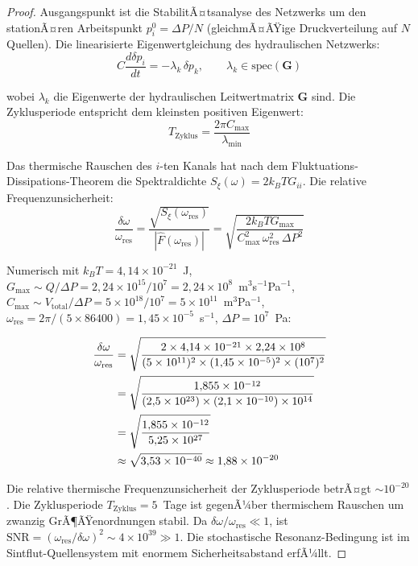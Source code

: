 ﻿\documentclass[12pt,a4paper]{report}
\begin{document}
\begin{proof}
	Ausgangspunkt ist die StabilitÃ¤tsanalyse des Netzwerks um den stationÃ¤ren Arbeitspunkt $p_i^0 = \Delta P/N$ (gleichmÃ¤ÃŸige Druckverteilung auf $N$ Quellen). Die linearisierte Eigenwertgleichung des hydraulischen Netzwerks:
	\begin{equation}
		C\frac{d\delta p_i}{dt} = -\lambda_k\,\delta p_k, \qquad \lambda_k \in \mathrm{spec}(\mathbf{G})
		\label{eq:eigenwertgleichung}
	\end{equation}
	
	wobei $\lambda_k$ die Eigenwerte der hydraulischen Leitwertmatrix $\mathbf{G}$ sind. Die Zyklusperiode entspricht dem kleinsten positiven Eigenwert:
	\begin{equation}
		T_\mathrm{Zyklus} = \frac{2\pi C_\mathrm{max}}{\lambda_\mathrm{min}}
		\label{eq:zyklusperiode_eigenwert}
	\end{equation}
	
	Das thermische Rauschen des $i$-ten Kanals hat nach dem Fluktuations-Dissipations-Theorem die Spektraldichte $S_\xi(\omega) = 2k_BT G_{ii}$. Die relative Frequenzunsicherheit:
	\begin{equation}
		\frac{\delta\omega}{\omega_\mathrm{res}} = \frac{\sqrt{S_\xi(\omega_\mathrm{res})}}{|\hat{F}(\omega_\mathrm{res})|}
		= \sqrt{\frac{2k_BT G_\mathrm{max}}{C_\mathrm{max}^2\,\omega_\mathrm{res}^2\,\Delta P^2}}
		\label{eq:frequenzunsicherheit}
	\end{equation}
	
	Numerisch mit $k_BT = 4{,}14\times10^{-21}$~J, $G_\mathrm{max} \sim Q/\Delta P = 2{,}24\times10^{15}/10^7 = 2{,}24\times10^8$~m$^3$s$^{-1}$Pa$^{-1}$, $C_\mathrm{max} \sim V_\mathrm{total}/\Delta P = 5\times10^{18}/10^7 = 5\times10^{11}$~m$^3$Pa$^{-1}$, $\omega_\mathrm{res} = 2\pi/(5\times86400) = 1{,}45\times10^{-5}$~s$^{-1}$, $\Delta P = 10^7$~Pa:
	
	\begin{align}
		\frac{\delta\omega}{\omega_\mathrm{res}} &= \sqrt{\frac{2\times4{,}14\times10^{-21}\times2{,}24\times10^8}{(5\times10^{11})^2\times(1{,}45\times10^{-5})^2\times(10^7)^2}} \notag\\
		&= \sqrt{\frac{1{,}855\times10^{-12}}{(2{,}5\times10^{23})\times(2{,}1\times10^{-10})\times10^{14}}} \notag\\
		&= \sqrt{\frac{1{,}855\times10^{-12}}{5{,}25\times10^{27}}} \notag\\
		&\approx \sqrt{3{,}53\times10^{-40}} \approx 1{,}88\times10^{-20}
		\label{eq:frequenzunsicherheit_numerisch}
	\end{align}
	
	Die relative thermische Frequenzunsicherheit der Zyklusperiode betrÃ¤gt $\sim 10^{-20}$. Die Zyklusperiode $T_\mathrm{Zyklus} = 5$~Tage ist gegenÃ¼ber thermischem Rauschen um zwanzig GrÃ¶ÃŸenordnungen stabil. Da $\delta\omega/\omega_\mathrm{res} \ll 1$, ist $\mathrm{SNR} = (\omega_\mathrm{res}/\delta\omega)^2 \sim 4\times10^{39} \gg 1$. Die stochastische Resonanz-Bedingung ist im Sintflut-Quellensystem mit enormem Sicherheitsabstand erfÃ¼llt.
\end{proof}
\end{document}
